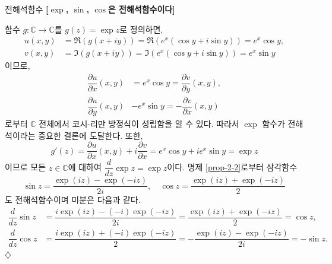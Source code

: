 \begin{saltexample}{전해석함수} {} \label{example-2-8}
\textbf{[$\exp$, $\sin$, $\cos$은 전해석함수이다]}

함수 $g:\mathbb C \to \mathbb C$를 $g(z) = \exp z$로 정의하면,
\begin{align*}
u(x,y) &= \Re(g(x+iy)) = \Re(e^x(\cos y + i\sin y)) = e^x \cos y,\\
v(x,y) &= \Im(g(x+iy)) = \Im(e^x(\cos y + i\sin y)) = e^x \sin y
\end{align*}
이므로, 
\begin{align*}
\dfrac{\partial u}{\partial x}(x,y) &= e^x\cos y 
= \dfrac{\partial v}{\partial y}(x,y), \\
\dfrac{\partial u}{\partial y}(x,y) & -e^x\sin y 
= - \dfrac{\partial v}{\partial x}(x,y)
\end{align*}
로부터 $\mathbb C$ 전체에서 코시-리만 방정식이 성립함을 알 수 있다.
따라서 $\exp$ 함수가 전해석이라는 중요한 결론에 도달한다.
또한, 
\[
g'(z) = \dfrac{\partial u}{\partial x}(x,y) + i\dfrac{\partial v}{\partial x}
= e^x\cos y + i e^x\sin y = \exp z
\]
이므로 모든 $z\in\mathbb C$에 대하여 $\dfrac{d}{dz}\exp z = \exp z$이다.
명제 \ref{prop-2-2}로부터 삼각함수
\[
\sin z  = \dfrac{\exp(iz) - \exp(-iz)}{2i}, \quad
\cos z = \dfrac{\exp(iz) + \exp(-iz)}2
\]
도 전해석함수이며 미분은 다음과 같다.
\begin{align*}
\dfrac{d}{dz} \sin z &= \dfrac{i\exp(iz) - (-i)\exp(-iz)}{2i}
= \dfrac{\exp(iz) + \exp(-iz)}2 = \cos z, \\
\dfrac{d}{dz} \cos z &= \dfrac{i\exp(iz)+(-i)\exp(-iz)}2
= - \dfrac{\exp(iz) - \exp(-iz)}{2i} = - \sin z.
\end{align*}
\hfill $\diamondsuit$
\end{saltexample}

